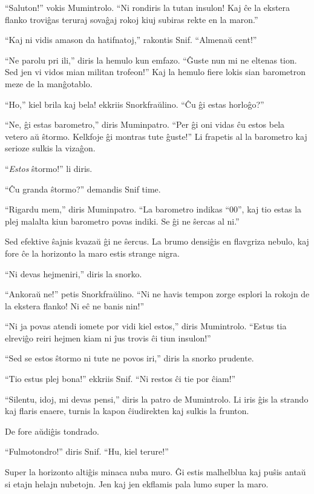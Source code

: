 ``Saluton!'' vokis Mumintrolo. ``Ni rondiris la tutan insulon! Kaj ĉe la ekstera flanko troviĝas teruraj sovaĝaj rokoj kiuj subiras rekte en la maron.''

``Kaj ni vidis amason da hatifnatoj,'' rakontis Snif. ``Almenaŭ cent!''

``Ne parolu pri ili,'' diris la hemulo kun emfazo. ``Ĝuste nun mi ne eltenas tion. Sed jen vi vidos mian militan trofeon!'' Kaj la hemulo fiere lokis sian barometron meze de la manĝotablo.

``Ho,'' kiel brila kaj bela! ekkriis Snorkfraŭlino. ``Ĉu ĝi estas horloĝo?''

``Ne, ĝi estas barometro,'' diris Muminpatro. ``Per ĝi oni vidas ĉu estos bela vetero aŭ ŝtormo. Kelkfoje ĝi montras tute ĝuste!'' Li frapetis al la barometro kaj serioze sulkis la vizaĝon.

``\emph{Estos} ŝtormo!'' li diris.

``Ĉu granda ŝtormo?'' demandis Snif time.

``Rigardu mem,'' diris Muminpatro. ``La barometro indikas ``00'', kaj tio estas la plej malalta kiun barometro povas indiki. Se ĝi ne ŝercas al ni.''

Sed efektive ŝajnis kvazaŭ ĝi ne ŝercus. La brumo densiĝis en flavgriza nebulo, kaj fore ĉe la horizonto la maro estis strange nigra.

``Ni devas hejmeniri,'' diris la snorko.

``Ankoraŭ ne!'' petis Snorkfraŭlino. ``Ni ne havis tempon zorge esplori la rokojn de la ekstera flanko! Ni eĉ ne banis nin!''

``Ni ja povas atendi iomete por vidi kiel estos,'' diris Mumintrolo. ``Estus tia elreviĝo reiri hejmen kiam ni ĵus trovis ĉi tiun insulon!''

``Sed se estos ŝtormo ni tute ne povos iri,'' diris la snorko prudente.

``Tio estus plej bona!'' ekkriis Snif. ``Ni restos ĉi tie por ĉiam!''

``Silentu, idoj, mi devas pensi,'' diris la patro de Mumintrolo. Li iris ĝis la strando kaj flaris enaere, turnis la kapon ĉiudirekten kaj sulkis la frunton.

De fore aŭdiĝis tondrado.

``Fulmotondro!'' diris Snif. ``Hu, kiel terure!''

Super la horizonto altiĝis minaca nuba muro. Ĝi estis malhelblua kaj puŝis antaŭ si etajn helajn nubetojn. Jen kaj jen ekflamis pala lumo super la maro.

